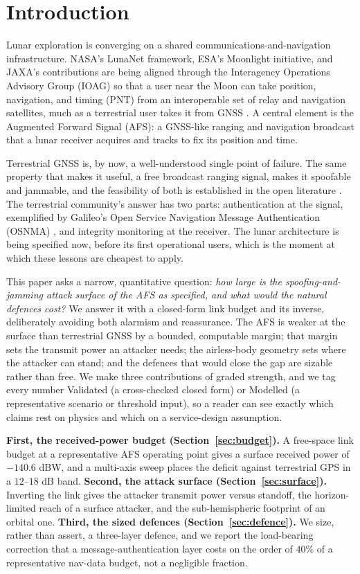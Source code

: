 \documentclass[conference]{IEEEtran}
\begin{document}
\section{Introduction}
Lunar exploration is converging on a shared communications-and-navigation
infrastructure. NASA's LunaNet framework, ESA's Moonlight initiative, and JAXA's
contributions are being aligned through the Interagency Operations Advisory Group
(IOAG) so that a user near the Moon can take position, navigation, and timing (PNT)
from an interoperable set of relay and navigation satellites, much as a terrestrial
user takes it from GNSS \cite{lunanet,moonlight,ioag}. A central element is the
Augmented Forward Signal (AFS): a GNSS-like ranging and navigation broadcast that a
lunar receiver acquires and tracks to fix its position and time.

Terrestrial GNSS is, by now, a well-understood single point of failure. The same
property that makes it useful, a free broadcast ranging signal, makes it spoofable
and jammable, and the feasibility of both is established in the open literature
\cite{humphreys,psiaki,tippenhauer}. The terrestrial community's answer has two
parts: authentication at the signal, exemplified by Galileo's Open Service
Navigation Message Authentication (OSNMA) \cite{osnma,osnmaicd}, and integrity
monitoring at the receiver. The lunar architecture is being specified now, before
its first operational users, which is the moment at which these lessons are
cheapest to apply.

This paper asks a narrow, quantitative question: \emph{how large is the
spoofing-and-jamming attack surface of the AFS as specified, and what would the
natural defences cost?} We answer it with a closed-form link budget and its
inverse, deliberately avoiding both alarmism and reassurance. The AFS is weaker at
the surface than terrestrial GNSS by a bounded, computable margin; that margin sets
the transmit power an attacker needs; the airless-body geometry sets where the
attacker can stand; and the defences that would close the gap are sizable rather
than free. We make three contributions of graded strength, and we tag every
number Validated (a cross-checked closed form) or Modelled (a representative
scenario or threshold input), so a reader can see exactly which claims rest on
physics and which on a service-design assumption.

\textbf{First, the received-power budget (Section~\ref{sec:budget}).} A free-space
link budget at a representative AFS operating point gives a surface received power
of $-140.6$ dBW, and a multi-axis sweep places the deficit against terrestrial GPS
in a $12$--$18$ dB band. \textbf{Second, the attack surface
(Section~\ref{sec:surface}).} Inverting the link gives the attacker transmit power
versus standoff, the horizon-limited reach of a surface attacker, and the
sub-hemispheric footprint of an orbital one. \textbf{Third, the sized defences
(Section~\ref{sec:defence}).} We size, rather than assert, a three-layer defence,
and we report the load-bearing correction that a message-authentication layer costs
on the order of $40\%$ of a representative nav-data budget, not a negligible
fraction.
\end{document}
